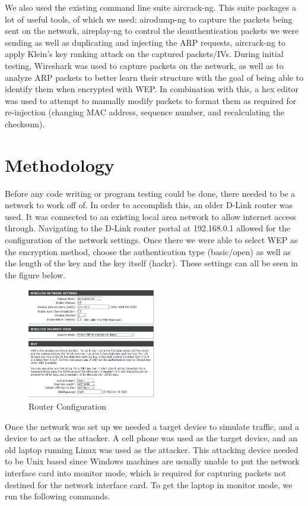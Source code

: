 \documentclass[10pt, titlepage]{article}
\begin{document}
We also used the existing command line suite aircrack-ng. This suite packages a lot of useful tools, of which we used: airodump-ng to capture the packets being sent on the network, aireplay-ng to control the deauthentication packets we were sending as well as duplicating and injecting the ARP requests, aircrack-ng to apply Klein's key ranking attack on the captured packets/IVs. During initial testing, Wireshark was used to capture packets on the network, as well as to analyze ARP packets to better learn their structure with the goal of being able to identify them when encrypted with WEP. In combination with this, a hex editor was used to attempt to manually modify packets to format them as required for re-injection (changing MAC address, sequence number, and recalculating the checksum).

\section{Methodology}
Before any code writing or program testing could be done, there needed to be a network to work off of. In order to accomplish this, an older D-Link router was used. It was connected to an existing local area network to allow internet access through. Navigating to the D-Link router portal at 192.168.0.1 allowed for the configuration of the network settings. Once there we were able to select WEP as the encryption method, choose the authentication type (basic/open) as well as the length of the key and the key itself (hackr). These settings can all be seen in the figure below.\\

\begin{figure}[H]
 	\centering
    \includegraphics[width=0.5\textwidth]{./images/wep_settings.png}
    \caption{Router Configuration}
\end{figure}

Once the network was set up we needed a target device to simulate traffic, and a device to act as the attacker. A cell phone was used as the target device, and an old laptop running Linux was used as the attacker. This attacking device needed to be Unix based since Windows machines are usually unable to put the network interface card into monitor mode, which is required for capturing packets not destined for the network interface card. To get the laptop in monitor mode, we run the following commands.\\
\end{document}
